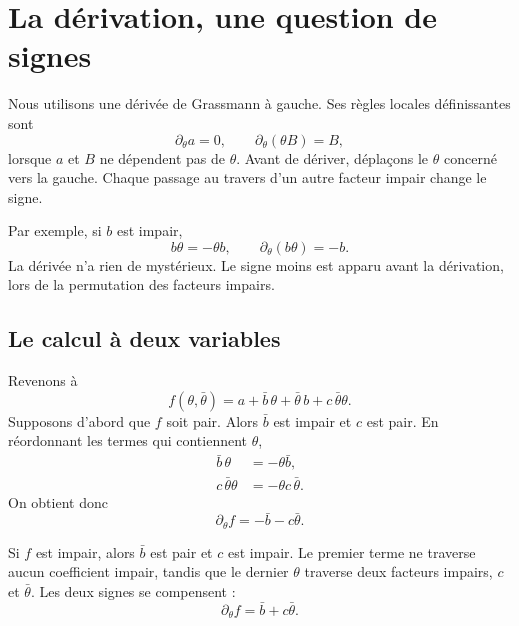 \section{La dérivation, une question de signes}

Nous utilisons une dérivée de Grassmann à gauche. Ses règles locales définissantes sont
\begin{equation}
\partial_\theta a=0,
\qquad
\partial_\theta(\theta B)=B,
\end{equation}
lorsque \(a\) et \(B\) ne dépendent pas de \(\theta\). Avant de dériver, déplaçons le \(\theta\) concerné vers la gauche. Chaque passage au travers d’un autre facteur impair change le signe.

Par exemple, si \(b\) est impair,
\begin{equation}
b\theta=-\theta b,
\qquad
\partial_\theta(b\theta)=-b.
\end{equation}
La dérivée n’a rien de mystérieux. Le signe moins est apparu avant la dérivation, lors de la permutation des facteurs impairs.

\subsection{Le calcul à deux variables}

Revenons à
\begin{equation}
f(\theta,\bar\theta)
=a+\bar b\,\theta+\bar\theta\,b+c\,\bar\theta\theta.
\end{equation}
Supposons d’abord que \(f\) soit pair. Alors \(\bar b\) est impair et \(c\) est pair. En réordonnant les termes qui contiennent \(\theta\),
\begin{align}
\bar b\,\theta&=-\theta\bar b,\\
c\,\bar\theta\theta&=-\theta c\,\bar\theta.
\end{align}
On obtient donc
\begin{equation}
\partial_\theta f=-\bar b-c\bar\theta.
\end{equation}

Si \(f\) est impair, alors \(\bar b\) est pair et \(c\) est impair. Le premier terme ne traverse aucun coefficient impair, tandis que le dernier \(\theta\) traverse deux facteurs impairs, \(c\) et \(\bar\theta\). Les deux signes se compensent :
\begin{equation}
\partial_\theta f=\bar b+c\bar\theta.
\end{equation}

\begin{classroomqa}
\end{classroomqa}

